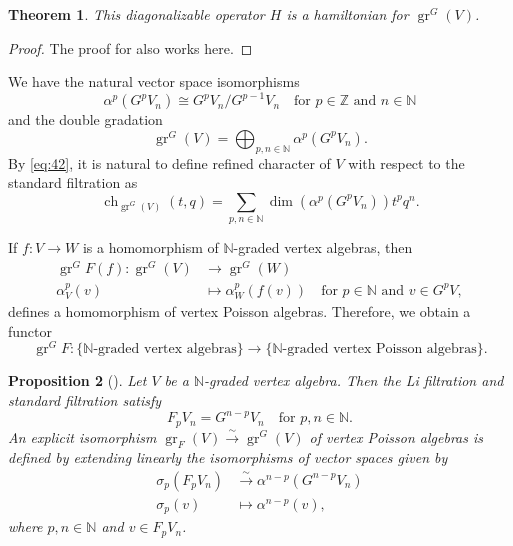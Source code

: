 \documentclass[a4paper, 12pt, reqno]{amsart}
\newtheorem{theorem}{Theorem}[subsection]
\newtheorem{proposition}[theorem]{Proposition}
\theoremstyle{remark}
\numberwithin{equation}{subsection}
\DeclareMathOperator{\gr}{gr}
\DeclareMathOperator{\ch}{ch}
\begin{document}
\begin{theorem}
  \label{thr:33}
  This diagonalizable operator $H$ is a hamiltonian for $\gr^G(V)$.
\end{theorem}

\begin{proof}
  The proof for  also works here.
\end{proof}

We have the natural vector space isomorphisms
\begin{equation*}
  \alpha^p(G^pV_n) \cong G^pV_n/G^{p - 1}V_n \quad \text{for }p \in \mathbb{Z}\text{ and }n \in \mathbb{N}
\end{equation*}
and the double gradation
\begin{equation}
  \label{eq:42}
  \gr^G(V) =\bigoplus_{p, n \in \mathbb{N}}\alpha^p(G^pV_n).
\end{equation}
By \eqref{eq:42}, it is natural to define refined character of $V$ with respect to the standard filtration as
\begin{equation*}
  \ch_{\gr^G(V)}(t, q) = \sum_{p, n \in \mathbb{N}}\dim(\alpha^p(G^pV_n))t^pq^n.
\end{equation*}

If $f: V \to W$ is a homomorphism of $\mathbb{N}$-graded vertex algebras, then
\begin{align*}
  \gr^GF(f): \gr^G(V) &\to \gr^G(W) \\
  \alpha_V^p(v) &\mapsto \alpha_W^p(f(v)) \quad \text{for }p \in \mathbb{N}\text{ and } v \in G^pV,
\end{align*}
defines a homomorphism of vertex Poisson algebras.
Therefore, we obtain a functor
\begin{equation*}
  \gr^GF: \{\text{$\mathbb{N}$-graded vertex algebras}\} \to \{\text{$\mathbb{N}$-graded vertex Poisson algebras}\}.
\end{equation*}

\begin{proposition}[{\cite[Proposition 2.6.1]{arakawa_remark_2012}}]
  \label{prp:9}
  Let $V$ be a $\mathbb{N}$-graded vertex algebra.
  Then the Li filtration and standard filtration satisfy
  \begin{equation*}
    F_pV_n = G^{n - p}V_n \quad \text{for }p, n \in \mathbb{N}.
  \end{equation*}
  An explicit isomorphism $\gr_F(V) \xrightarrow{\sim} \gr^G(V)$ of vertex Poisson algebras is defined by extending linearly the isomorphisms of vector spaces given by
  \begin{align*}
    \sigma_p(F_pV_n) &\xrightarrow{\sim} \alpha^{n - p}(G^{n - p}V_n) \\
    \sigma_p(v) &\mapsto \alpha^{n - p}(v),
  \end{align*}
  where $p, n \in \mathbb{N}$ and $v \in F_pV_n$.
\end{proposition}
\end{document}
